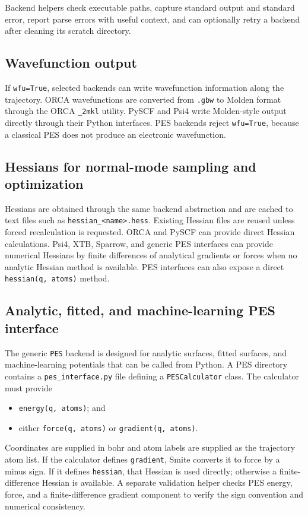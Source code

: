 \documentclass[11pt]{article}
\begin{document}
Backend helpers check executable paths, capture standard output and standard error, report parse errors with useful context, and can optionally retry a backend after cleaning its scratch directory.

\subsection{Wavefunction output}

If \texttt{wfu=True}, selected backends can write wavefunction information along the trajectory.  ORCA wavefunctions are converted from \texttt{.gbw} to Molden format through the ORCA \texttt{\_2mkl} utility.  PySCF and Psi4 write Molden-style output directly through their Python interfaces.  PES backends reject \texttt{wfu=True}, because a classical PES does not produce an electronic wavefunction.

\subsection{Hessians for normal-mode sampling and optimization}

Hessians are obtained through the same backend abstraction and are cached to text files such as \texttt{hessian\_<name>.hess}.  Existing Hessian files are reused unless forced recalculation is requested.  ORCA and PySCF can provide direct Hessian calculations.  Psi4, XTB, Sparrow, and generic PES interfaces can provide numerical Hessians by finite differences of analytical gradients or forces when no analytic Hessian method is available.  PES interfaces can also expose a direct \texttt{hessian(q, atoms)} method.

\subsection{Analytic, fitted, and machine-learning PES interface}

The generic \texttt{PES} backend is designed for analytic surfaces, fitted surfaces, and machine-learning potentials that can be called from Python.  A PES directory contains a \texttt{pes\_interface.py} file defining a \texttt{PESCalculator} class.  The calculator must provide
\begin{itemize}
  \item \texttt{energy(q, atoms)}; and
  \item either \texttt{force(q, atoms)} or \texttt{gradient(q, atoms)}.
\end{itemize}
Coordinates are supplied in bohr and atom labels are supplied as the trajectory atom list.  If the calculator defines \texttt{gradient}, Smite converts it to force by a minus sign.  If it defines \texttt{hessian}, that Hessian is used directly; otherwise a finite-difference Hessian is available.  A separate validation helper checks PES energy, force, and a finite-difference gradient component to verify the sign convention and numerical consistency.
\end{document}
